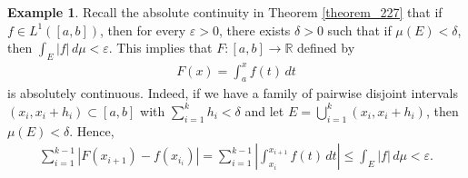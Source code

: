 \documentclass[11pt]{book}
\theoremstyle{definition}
\newtheorem{example}{Example}[chapter]
\numberwithin{equation}{chapter}
\begin{document}
\begin{example}\label{example_64}
Recall the absolute continuity in  Theorem \ref{theorem_227} that if $f \in L^1([a,b])$, then for every $\varepsilon > 0$, there exists $\delta > 0$ such that if $\mu(E) < \delta$, then $\int_E \left|f\right|\,d\mu < \varepsilon$. This implies that $F:[a,b] \to \mathbb{R}$ defined by
\begin{align*}
    F(x) = \int^x_a f(t)\,dt
\end{align*}
is absolutely continuous. Indeed, if we have a family of pairwise disjoint intervals $(x_i,x_i+h_i) \subset [a,b]$ with $\sum^k_{i=1} h_i < \delta$ and let $E = \bigcup^k_{i=1} (x_i,x_i+h_i)$, then $\mu(E) < \delta$. Hence,
\begin{align*}
    \sum^{k-1}_{i=1} \left|F(x_{i+1}) - f(x_{i_{i}})\right| = \sum^{k-1}_{i=1} \left|\int^{x_{i+1}}_{x_i} f(t)\,dt \right| \leq \int_E \left|f\right|\,d\mu < \varepsilon.
\end{align*}
\end{example}

\medskip
\end{document}
